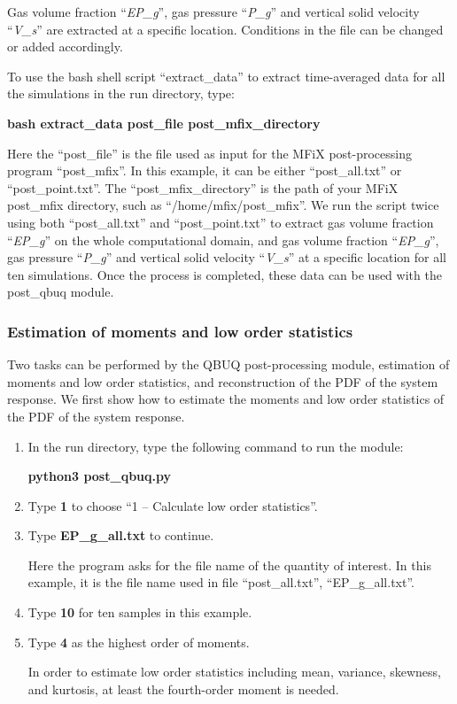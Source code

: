 \documentclass[a4paper,12pt,titlepage]{article}
\newcommand{\MFIX}{MFiX }
\begin{document}
Gas volume fraction ``\emph{EP\_g}'', gas pressure ``\emph{P\_g}'' and vertical
solid velocity ``\emph{V\_s}'' are extracted at a specific location. Conditions
in the file can be changed or added accordingly.

To use the bash shell script ``extract\_data'' to extract time-averaged data for
all the simulations in the run directory, type:

\textbf{bash extract\_data post\_file post\_mfix\_directory}

Here the ``post\_file'' is the file used as input for the \MFIX post-processing
program ``post\_mfix''. In this example, it can be either ``post\_all.txt'' or
``post\_point.txt''. The ``post\_mfix\_directory'' is the path of your \MFIX\\
post\_mfix directory, such as ``/home/mfix/post\_mfix''. We run the script twice
using both ``post\_all.txt'' and ``post\_point.txt'' to extract gas volume
fraction ``\emph{EP\_g}'' on the whole computational domain, and gas volume
fraction ``\emph{EP\_g}'', gas pressure ``\emph{P\_g}'' and vertical solid
velocity ``\emph{V\_s}'' at a specific location for all ten simulations. Once
the process is completed, these data can be used with the post\_qbuq module.

\subsubsection{Estimation of moments and low order statistics}
\label{sec:LowOrder}

Two tasks can be performed by the QBUQ post-processing module, estimation of
moments and low order statistics, and reconstruction of the PDF of the system
response. We first show how to estimate the moments and low order statistics of
the PDF of the system response.

\begin{enumerate}[leftmargin=0cm,itemindent=0.5cm]
 \item In the run directory, type the following command to run the module:
 
  \textbf{python3 post\_qbuq.py}
  
 \item Type \textbf{1} to choose ``1 -- Calculate low order statistics''.
 
 \item Type \textbf{EP\_g\_all.txt} to continue.
 
 Here the program asks for the file name of the quantity of interest. In this
 example, it is the file name used in file ``post\_all.txt'',
 ``EP\_g\_all.txt''.
 
 \item Type \textbf{10} for ten samples in this example.
 
 \item Type \textbf{4} as the highest order of moments.
 
 In order to estimate low order statistics including mean, variance, skewness, 
 and kurtosis, at least the fourth-order moment is needed.
\end{enumerate}
\end{document}
